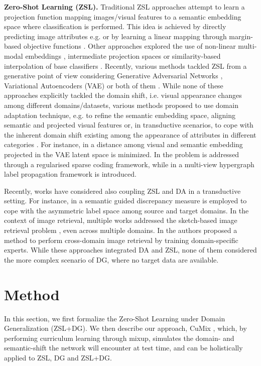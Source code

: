 \documentclass[runningheads]{llncs}
\newcommand{\myparagraph}[1]{\noindent\textbf{#1}}
\newcommand{\methodName}{{CuMix} }
\begin{document}
\myparagraph{Zero-Shot Learning (ZSL).} 
Traditional ZSL approaches attempt to learn a projection function mapping images/visual features to a semantic embedding space where  classification is performed. This idea is achieved by directly predicting image attributes e.g. \cite{lampert2013awa} or by learning a linear mapping through margin-based objective functions \cite{akata2013label,akata2015evaluation}. Other approaches explored the use of non-linear multi-modal embeddings \cite{xian2016latent}, intermediate projection spaces \cite{zhang2015zero,zhang2016zero} or similarity-based interpolation of base classifiers \cite{changpinyo2016synthesized}. Recently, various methods tackled ZSL from a generative point of view considering Generative Adversarial Networks  \cite{xian2018feature}, Variational Autoencoders (VAE) \cite{schonfeld2019generalized} or both of them \cite{xian2019fvaegan}. While none of these approaches explicitly tackled the domain shift, i.e. visual appearance changes among different domains/datasets, various methods proposed to use domain adaptation technique, e.g. to refine the semantic embedding space, aligning semantic and projected visual features \cite{schonfeld2019generalized} or, in transductive scenarios, to cope with the inherent domain shift existing among the appearance of attributes in different categories \cite{Kodirov_2015_ICCV,fu2015transductive,gan2016learning}. For instance, in \cite{schonfeld2019generalized} a distance among visual and semantic embedding projected in the VAE latent space is minimized. In \cite{Kodirov_2015_ICCV} the problem is addressed through a regularised sparse coding framework, while in \cite{fu2015transductive} a multi-view hypergraph label propagation framework is introduced.

Recently, works have considered also coupling ZSL and DA in a transductive setting. For instance, in \cite{zhuo2019unsupervised} a semantic guided discrepancy measure is employed to cope with the asymmetric label space among source and target domains. In the context of image retrieval, multiple works addressed the sketch-based image retrieval problem \cite{yelamarthi2018sketch,Dutta_2019_CVPR}, even across multiple domains. In \cite{thong2019open} the authors proposed a method to perform cross-domain image retrieval by training domain-specific experts. While these approaches integrated DA and ZSL, none of them considered the more complex scenario of DG, where no target data are available. 
 
\section{Method}
In this section, we first formalize the Zero-Shot Learning under Domain Generalization (ZSL+DG). We then describe our approach, \methodName, which, by performing curriculum learning through mixup, simulates the domain- and semantic-shift the network will encounter at test time, and can be holistically applied to ZSL, DG and ZSL+DG. 
\end{document}
